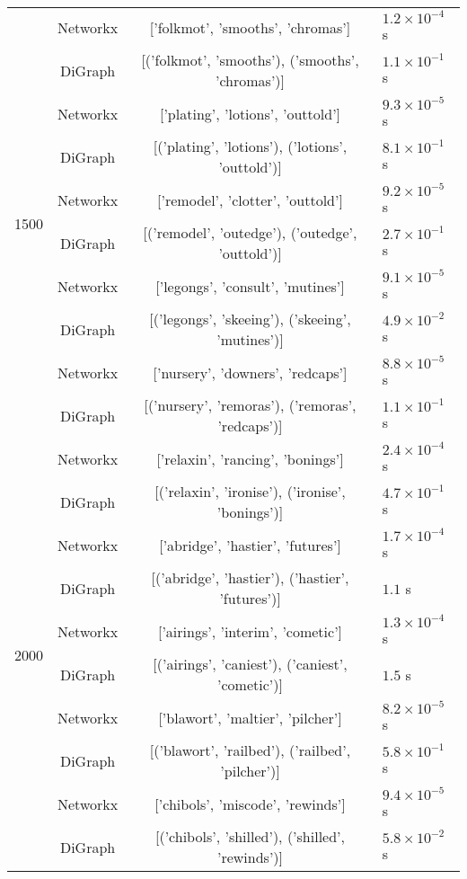 \documentclass{article}[12 pt]
\begin{document}
\begin{center}
\begin{tabular}{ |c|c|c|l| }
			\multirow{10}{*}{1500} & Networkx & ['folkmot', 'smooths', 'chromas'] & $1.2\times 10^{-4}$ s\\
			& DiGraph &[('folkmot', 'smooths'), ('smooths', 'chromas')] & $1.1\times 10^{-1}$ s\\
			& Networkx & ['plating', 'lotions', 'outtold'] & $9.3\times 10^{-5}$ s\\
			& DiGraph & [('plating', 'lotions'), ('lotions', 'outtold')] & $8.1\times 10^{-1}$ s\\
			& Networkx & ['remodel', 'clotter', 'outtold'] & $9.2\times 10^{-5}$ s\\
			& DiGraph & [('remodel', 'outedge'), ('outedge', 'outtold')] & $2.7\times 10^{-1}$ s\\
			& Networkx &['legongs', 'consult', 'mutines'] & $9.1\times 10^{-5}$ s\\
			& DiGraph & [('legongs', 'skeeing'), ('skeeing', 'mutines')] & $4.9\times 10^{-2}$ s\\
			& Networkx & ['nursery', 'downers', 'redcaps'] & $8.8\times 10^{-5}$ s\\
			& DiGraph & [('nursery', 'remoras'), ('remoras', 'redcaps')] & $1.1\times 10^{-1}$ s\\\hline
			
			\multirow{10}{*}{2000} & Networkx & ['relaxin', 'rancing', 'bonings'] & $2.4\times 10^{-4}$ s\\
			& DiGraph &[('relaxin', 'ironise'), ('ironise', 'bonings')] & $4.7\times 10^{-1}$ s\\
			& Networkx &['abridge', 'hastier', 'futures'] & $1.7\times 10^{-4}$ s\\
			& DiGraph & [('abridge', 'hastier'), ('hastier', 'futures')] & $1.1$ s\\
			& Networkx & ['airings', 'interim', 'cometic'] & $1.3\times 10^{-4}$ s\\
			& DiGraph & [('airings', 'caniest'), ('caniest', 'cometic')] & $1.5$ s\\
			& Networkx &['blawort', 'maltier', 'pilcher'] & $8.2\times 10^{-5}$ s\\
			& DiGraph & [('blawort', 'railbed'), ('railbed', 'pilcher')] & $5.8\times 10^{-1}$ s\\
			& Networkx & ['chibols', 'miscode', 'rewinds'] & $9.4\times 10^{-5}$ s\\
			& DiGraph & [('chibols', 'shilled'), ('shilled', 'rewinds')] & $5.8\times 10^{-2}$ s\\\hline
			

\end{tabular}
\end{center}
\end{document}
